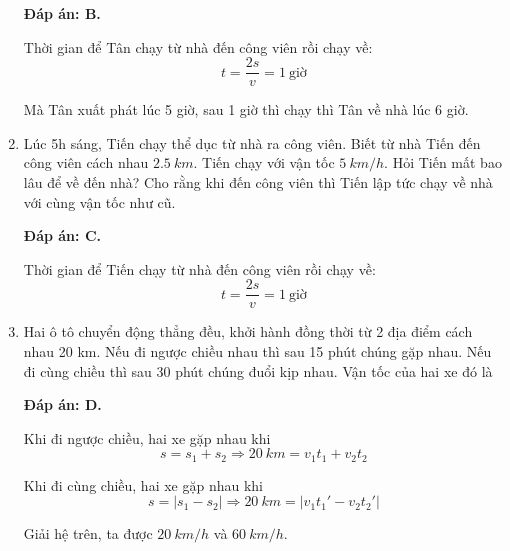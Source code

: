 \begin{enumerate}[label=\bfseries Câu \arabic*:]
{	}
	
	\hideall
	{\textbf{Đáp án: B.}
		
		Thời gian để Tân chạy từ nhà đến công viên rồi chạy về:
		$$t= \dfrac{2s}{v} = 1\ \text{giờ}$$
		
		Mà Tân xuất phát lúc 5 giờ, sau 1 giờ thì chạy thì Tân về nhà lúc 6 giờ.	
	}
	\item {}
	
	
	{Lúc 5h sáng, Tiến chạy thể dục từ nhà ra công viên. Biết từ nhà Tiến đến công viên cách nhau $\SI{2.5}{km}$. Tiến chạy với vận tốc $\SI{5}{km/h}$. Hỏi Tiến mất bao lâu để về đến nhà? Cho rằng khi đến công viên thì Tiến lập tức chạy về nhà với cùng vận tốc như cũ.
		
		
	}
	
	\hideall
	{\textbf{Đáp án: C.}
		
		Thời gian để Tiến chạy từ nhà đến công viên rồi chạy về:
		$$t= \dfrac{2s}{v} = 1\ \text{giờ}$$
	}
	\item {}
	
	
	{Hai ô tô chuyển động thẳng đều, khởi hành đồng thời từ 2 địa điểm cách nhau 20 km. Nếu đi ngược chiều nhau thì sau 15 phút chúng gặp nhau. Nếu đi cùng chiều thì sau 30 phút chúng đuổi kịp nhau. Vận tốc của hai xe đó là
		
		
	}
	
	\hideall
	{\textbf{Đáp án: D.}
		
		Khi đi ngược chiều, hai xe gặp nhau khi
		$$s = s_1 + s_2 \Rightarrow \SI{20}{km} = v_1 t_1 + v_2 t_2$$
		
		Khi đi cùng chiều, hai xe gặp nhau khi
		$$s=|s_1 - s_2| \Rightarrow \SI{20}{km} = |v_1 t_1' - v_2t_2'|$$
		
		Giải hệ trên, ta được $\SI{20}{km/h}$ và $\SI{60}{km/h}$.
	}
	
\end{enumerate}


